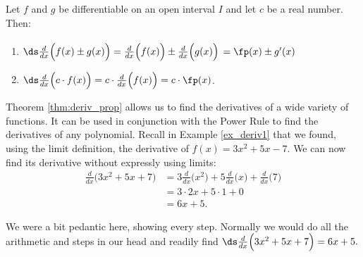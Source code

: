 {Let $f$ and $g$ be differentiable on an open interval $I$ and let $c$ be a real number. Then:
	\begin{enumerate}
	\item	{}
	
	$\ds \frac{d}{dx}\Big(f(x) \pm g(x)\Big) = \frac{d}{dx}\Big(f(x)\Big) \pm \frac{d}{dx}\Big(g(x)\Big)$ $= \rule{0pt}{15pt}\fp(x)\pm g'(x)$
	\item		{}
	
	$\ds \frac{d}{dx}\Big(c\cdot f(x)\Big) = c\cdot\frac{d}{dx}\Big(f(x)\Big) = c\cdot\fp(x)$.
	\end{enumerate}
}

Theorem \ref{thm:deriv_prop} allows us to find the derivatives of a wide variety of functions. It can be used in conjunction with the Power Rule to find the derivatives of any polynomial. Recall in Example \ref{ex_deriv1} that we found, using the limit definition, the derivative of $f(x) = 3x^2+5x-7$. We can now find its derivative without expressly using limits:
		\begin{align*}
		\frac{d}{dx}\Big(3x^2+5x+7\Big) &= 3\frac{d}{dx}\Big(x^2\Big) + 5\frac{d}{dx}\Big(x\Big) + \frac{d}{dx}\Big(7\Big) \\
																		&= 3\cdot 2x+5\cdot 1+ 0\\
																		&= 6x+5.
		\end{align*}

We were a bit pedantic here, showing every step. Normally we would do all the arithmetic and steps in our head and readily find $\ds \frac{d}{dx}\Big(3x^2+5x+7\Big) = 6x+5.$\\

